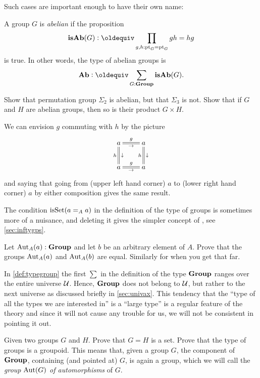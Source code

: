  Such cases are important enough to have their own name:
\begin{definition}\label{def:abgp}
  A group $G$ is \emph{abelian} if %
the proposition
$$\mathbf{isAb}(G)\defequi\prod_{g,h:\pt_G=\pt_G}gh=hg$$
is true.  In other words, the type of abelian groups is 
$$\mathbf{Ab}\defequi \sum_{G:\typegroup}\mathbf{isAb}(G).$$
\end{definition}
\begin{xca}\label{exer:first examples}
  Show that permutation group $\Sigma_2$ is abelian, but that $\Sigma_3$ is not.  Show that if $G$ and $H$ are abelian groups, then so is their product $G\times H$.
\end{xca}
We can envision $g$ commuting with $h$ by the picture
$$\xymatrix{a\ar@{=}[r]^g_\to\ar@{=}[d]^\downarrow_h&a\ar@{=}[d]^\downarrow_h\\
a\ar@{=}[r]^g_\to&a}$$
and saying that going from (upper left hand corner) $a$ to (lower right hand corner) $a$ by either composition gives the same result.

\begin{remark}
  The condition $\mathrm{isSet}(a=_Aa)$ in the definition of the type of groups is sometimes more of a nuisance, and deleting it gives the simpler concept of \aninftygp, see \cref{sec:inftygps}.
\end{remark}
\begin{xca}
   Let $\mathrm{Aut}_A(a):\mathbf{Group}$ and let $b$ be an arbitrary element of $A$.  Prove that the groups $\mathrm{Aut}_A(a)$ and $\mathrm{Aut}_A(b)$ are equal.  Similarly for \inftygps when you get that far.
\end{xca}
\begin{remark}\label{rem:monoidandabsgplarge}
 In \cref{def:typegroup} the first $\sum$ in the definition of the type $\mathbf{Group}$ ranges over the entire universe $\mathcal{U}$.  Hence, $\mathbf{Group}$ does not belong to $\mathcal{U}$, but rather to the next universe as discussed briefly in \cref{sec:univax}.   This tendency that the ``type of all the types we are interested in'' is a ``large type'' is a regular feature of the theory and since it will not cause any trouble for us, we will not be consistent in pointing it out.
  \end{remark}

  \begin{xca}\label{xca:typegroupisgroupoid}
    Given two groups $G$ and $H$.  Prove that $G=H$ is a set.   Prove that the type of groups is a groupoid.  This means that, given a group $G$, the component of $\mathbf{Group}$, containing (and pointed at) $G$, is again a group, which we will call the \emph{group $\mathrm{Aut}(G)$ of automorphisms} of $G$.
  \end{xca}

